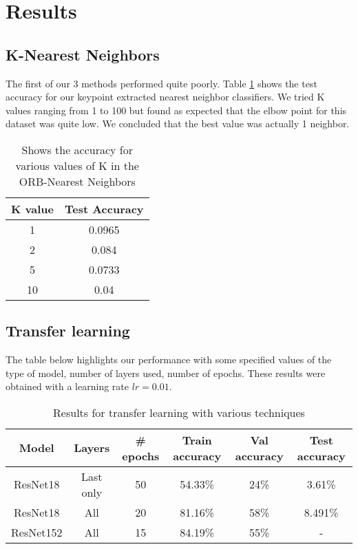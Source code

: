 \section{Results}
\subsection{K-Nearest Neighbors}

The first of our 3 methods performed quite poorly. Table \ref{fig:knn} shows the test accuracy for our keypoint extracted nearest neighbor classifiers. We tried K values ranging from 1 to 100 but found as expected that the elbow point for this dataset was quite low. We concluded that the best value was actually 1 neighbor.
\begin{table}[h!]
\centering
\begin{tabular}{|c|c|}\hline
	\textbf{K value} & \textbf{Test Accuracy}\\ \hline
	 1 & 0.0965\\ \hline
	 2  & 0.084\\ \hline
	5  & 0.0733\\ \hline
	10  & 0.04\\ \hline
\end{tabular}
\caption{\label{fig:knn} Shows the accuracy for various values of K in the ORB-Nearest Neighbors}
\end{table}

\subsection{Transfer learning}

The table below highlights our performance with some specified values of the type of model, number of layers used, number of epochs. These results were obtained with a learning rate $lr = 0.01$.

\begin{table}[h!]
	\centering
	\begin{tabular}{|c|c|c|c|c|c|}\hline
		\textbf{Model} & \textbf{Layers} & \textbf{\# epochs} & \textbf{Train accuracy} & \textbf{Val accuracy} & \textbf{Test accuracy}\\ \hline
		ResNet18  & Last only & 50 & 54.33\% & 24\% & 3.61\%\\ \hline
		ResNet18  & All & 20 & 81.16\% & 58\% & 8.491\%\\ \hline
		ResNet152 & All & 15 & 84.19\% & 55\% & -\\ \hline
	\end{tabular}
	\caption{\label{tab:transferresults}Results for transfer learning with various techniques}
\end{table}

